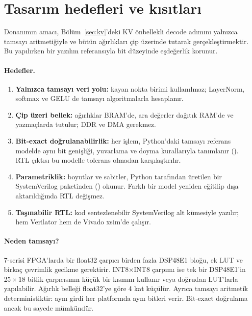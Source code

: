 \section{Tasarım hedefleri ve kısıtları}\label{sec:hedef}

Donanımın amacı, Bölüm~\ref{sec:kv}'deki KV önbellekli decode adımını yalnızca tamsayı aritmetiğiyle ve bütün ağırlıkları çip üzerinde tutarak gerçekleştirmektir. Bu yapılırken bir yazılım referansıyla bit düzeyinde eşdeğerlik korunur.

\paragraph{Hedefler.}
\begin{enumerate}
  \item \textbf{Yalnızca tamsayı veri yolu:} kayan nokta birimi kullanılmaz; LayerNorm, softmax ve GELU de tamsayı algoritmalarla hesaplanır.
  \item \textbf{Çip üzeri bellek:} ağırlıklar BRAM'de, ara değerler dağıtık RAM'de ve yazmaçlarda tutulur; DDR ve DMA gerekmez.
  \item \textbf{Bit-exact doğrulanabilirlik:} her işlem, Python'daki tamsayı referans modelde aynı bit genişliği, yuvarlama ve doyma kurallarıyla tanımlanır (). RTL çıktısı bu modelle tolerans olmadan karşılaştırılır.
  \item \textbf{Parametriklik:} boyutlar ve sabitler, Python tarafından üretilen bir SystemVerilog paketinden () okunur. Farklı bir model yeniden eğitilip dışa aktarıldığında RTL değişmez.
  \item \textbf{Taşınabilir RTL:} kod sentezlenebilir SystemVerilog alt kümesiyle yazılır; hem Verilator hem de Vivado xsim'de çalışır.
\end{enumerate}

\paragraph{Neden tamsayı?} 7-serisi FPGA'larda bir float32 çarpıcı birden fazla DSP48E1 bloğu, ek LUT ve birkaç çevrimlik gecikme gerektirir. INT8$\times$INT8 çarpımı ise tek bir DSP48E1'in $25\times18$ bitlik çarpıcısının küçük bir kısmını kullanır veya doğrudan LUT'larla yapılabilir. Ağırlık belleği float32'ye göre 4 kat küçülür. Ayrıca tamsayı aritmetik deterministiktir: aynı girdi her platformda aynı bitleri verir. Bit-exact doğrulama ancak bu sayede mümkündür.

